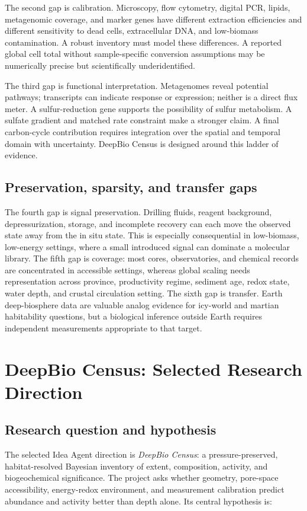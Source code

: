 \documentclass[conference]{../../../../Conference-LaTeX-template_10-17-19/IEEEtran}
\begin{document}
The second gap is calibration. Microscopy, flow cytometry, digital PCR, lipids, metagenomic coverage, and marker genes have different extraction efficiencies and different sensitivity to dead cells, extracellular DNA, and low-biomass contamination. A robust inventory must model these differences. A reported global cell total without sample-specific conversion assumptions may be numerically precise but scientifically underidentified.

The third gap is functional interpretation. Metagenomes reveal potential pathways; transcripts can indicate response or expression; neither is a direct flux meter. A sulfur-reduction gene supports the possibility of sulfur metabolism. A sulfate gradient and matched rate constraint make a stronger claim. A final carbon-cycle contribution requires integration over the spatial and temporal domain with uncertainty. DeepBio Census is designed around this ladder of evidence.

\subsection{Preservation, sparsity, and transfer gaps}
The fourth gap is signal preservation. Drilling fluids, reagent background, depressurization, storage, and incomplete recovery can each move the observed state away from the in situ state. This is especially consequential in low-biomass, low-energy settings, where a small introduced signal can dominate a molecular library. The fifth gap is coverage: most cores, observatories, and chemical records are concentrated in accessible settings, whereas global scaling needs representation across province, productivity regime, sediment age, redox state, water depth, and crustal circulation setting. The sixth gap is transfer. Earth deep-biosphere data are valuable analog evidence for icy-world and martian habitability questions, but a biological inference outside Earth requires independent measurements appropriate to that target.

\section{DeepBio Census: Selected Research Direction}
\subsection{Research question and hypothesis}
The selected Idea Agent direction is \textit{DeepBio Census}: a pressure-preserved, habitat-resolved Bayesian inventory of extent, composition, activity, and biogeochemical significance. The project asks whether geometry, pore-space accessibility, energy-redox environment, and measurement calibration predict abundance and activity better than depth alone. Its central hypothesis is:
\end{document}
